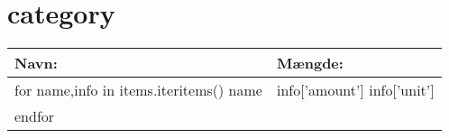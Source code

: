 \section*{ {{category}} }

\begin{tabular}{|l|l|}
  \hline
  \bf{Navn:} & \bf{Mængde:} \\
  \hline\hline
  {{for name,info in items.iteritems()}}
    {{name}} & {{info['amount']}} {{info['unit']}} \\
  {{endfor}}
  \hline
\end{tabular}

